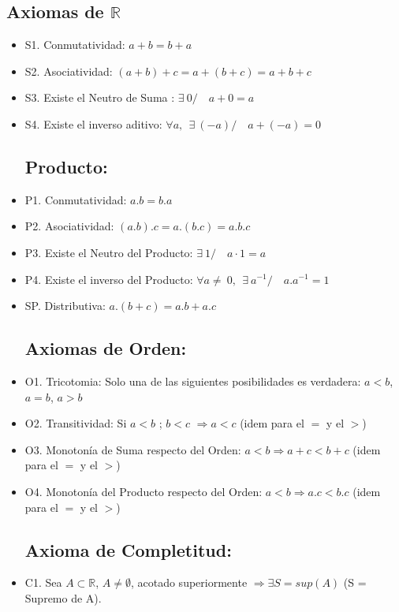 \documentclass[a4paper,11pt,spanish,sans]{exam}
\begin{document}
	\begin{center}
		\section*{Axiomas de $\mathbb{R}$}
	\end{center}
	
	\begin{itemize}
		\subsection*{Suma:}
		
		\item S1. Conmutatividad: $a+b=b+a$ 
		\item S2. Asociatividad: $(a+b)+c=a+(b+c)=a+b+c$ 
		\item S3. Existe el Neutro de Suma : $\exists \: 0/ \quad a + 0=a$ 
		\item S4. Existe el inverso aditivo: $\forall a, \: \: \exists \: (-a) / \quad a + (-a)=0$ 
		
		
		\subsection*{Producto:}
		\item P1. Conmutatividad: $a.b=b.a$ 
		\item P2. Asociatividad: $(a.b).c=a.(b.c)=a.b.c$ 
		\item P3. Existe el Neutro del Producto: $\exists \: 1/ \quad a \cdot 1=a$  
		\item P4. Existe el inverso del Producto: $\forall a\neq \: 0, \: \: \exists \:  a^{-1} / \quad a.a^{-1}=1$   \\
		
		\item SP. Distributiva: $a.(b+c)=a.b+a.c$
		
		\subsection*{Axiomas de Orden:}
		\item O1. Tricotomia: Solo una de las siguientes posibilidades es verdadera: $a<b$, $a=b$, $a>b$
		\item O2. Transitividad: Si $a<b$ ; $b<c$ $\Rightarrow a<c$ (idem para el $=$ y el $>$)
		\item O3. Monotonía de Suma respecto del Orden: $a<b \Rightarrow a+c<b+c$ (idem para el $=$ y el $>$)
		\item O4. Monotonía del Producto respecto del Orden: $a<b \Rightarrow a.c<b.c$ (idem para el $=$ y el $>$)
		
		\subsection*{Axioma de Completitud:}
		\item C1. Sea $A \subset \mathbb{R} $, $A\neq \emptyset$, acotado superiormente $\Rightarrow \exists S=sup(A)$ (S = Supremo de A).
	\end{itemize}
	
	
\end{document}
